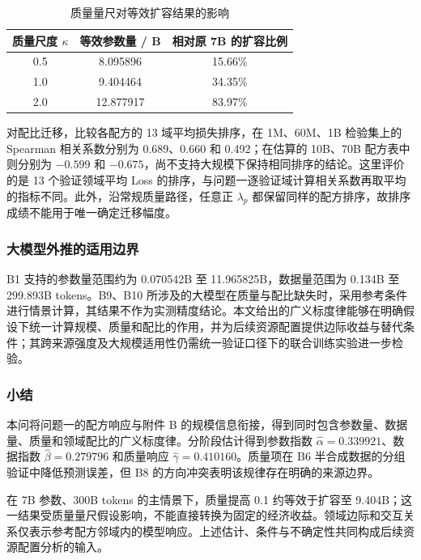 \documentclass[bwprint]{gmcmthesis}
\begin{document}
        \begin{table}[H]
         \centering
         \caption{质量量尺对等效扩容结果的影响}
         \label{tab:p2_sensitivity}
         \begin{tabular}{ccc}
          \toprule
          质量尺度 $\kappa$ & 等效参数量 / B & 相对原 7B 的扩容比例 \\
          \midrule
          0.5 & 8.095896 & 15.66\% \\
          1.0 & 9.404464 & 34.35\% \\
          2.0 & 12.877917 & 83.97\% \\
          \bottomrule
         \end{tabular}
        \end{table}
        
        对配比迁移，比较各配方的 13 域平均损失排序，在 1M、60M、1B 检验集上的 Spearman 相关系数分别为 0.689、0.660 和 0.492；在估算的 10B、70B 配方表中则分别为 $-0.599$ 和 $-0.675$，尚不支持大规模下保持相同排序的结论。这里评价的是 13 个验证领域平均 Loss 的排序，与问题一逐验证域计算相关系数再取平均的指标不同。此外，沿常规质量路径，任意正 $\lambda_p$ 都保留同样的配方排序，故排序成绩不能用于唯一确定迁移幅度。

        \subsubsection{大模型外推的适用边界}  %
        B1 支持的参数量范围约为 0.070542B 至 11.965825B，数据量范围为 0.134B 至 299.893B tokens。B9、B10 所涉及的大模型在质量与配比缺失时，采用参考条件进行情景计算，其结果不作为实测精度结论。本文给出的广义标度律能够在明确假设下统一计算规模、质量和配比的作用，并为后续资源配置提供边际收益与替代条件；其跨来源强度及大规模适用性仍需统一验证口径下的联合训练实验进一步检验。

        \subsubsection{小结}  %
        本问将问题一的配方响应与附件 B 的规模信息衔接，得到同时包含参数量、数据量、质量和领域配比的广义标度律。分阶段估计得到参数指数 $\widehat\alpha=0.339921$、数据指数 $\widehat\beta=0.279796$ 和质量响应 $\widehat\gamma=0.410160$。质量项在 B6 半合成数据的分组验证中降低预测误差，但 B8 的方向冲突表明该规律存在明确的来源边界。

        在 7B 参数、300B tokens 的主情景下，质量提高 0.1 约等效于扩容至 9.404B；这一结果受质量量尺假设影响，不能直接转换为固定的经济收益。领域边际和交互关系仅表示参考配方邻域内的模型响应。上述估计、条件与不确定性共同构成后续资源配置分析的输入。
        
\end{document}
